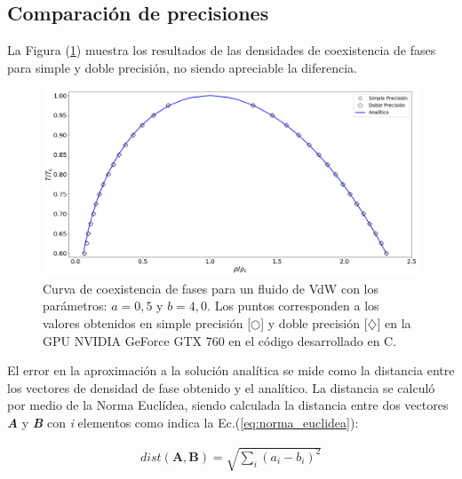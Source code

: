 \newpage
\subsection{Comparación de precisiones}

La Figura (\ref{fig:v_760_MxC_c_comparacion}) muestra los resultados de las densidades de coexistencia de fases para simple y doble precisión, no siendo apreciable la diferencia.

\begin{figure}[htbp]
	\centering
	\includegraphics[width=\textwidth]{figs/cap4/v_760_MxC_c_comparacion}
	\caption{Curva de coexistencia de fases para un fluido de VdW con los parámetros: $a = 0,5 $ y $b = 4,0 $. Los puntos corresponden a los valores obtenidos en simple precisión [$\bigcirc$] y doble precisión [$\diamondsuit$] en la GPU NVIDIA GeForce GTX 760 en el código desarrollado en \textsc{C}.} 
	\label{fig:v_760_MxC_c_comparacion}	
\end{figure}



El error en la aproximación a la solución analítica se mide como la distancia entre los vectores de densidad de fase obtenido y el analítico. La distancia se calculó por medio de la Norma Euclídea, siendo calculada la distancia entre dos vectores \textbf{\textit{A}} y \textbf{\textit{B}} con \textit{i} elementos como indica la Ec.(\ref{eq:norma_euclidea}):

\begin{align}
dist(\mathbf{A},\mathbf{B}) = \sqrt{\sum_i {\left( a_i - b_i \right)}^2  }
\label{eq:norma_euclidea}
\end{align}

